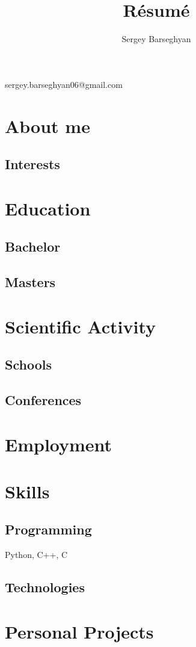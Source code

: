 \documentclass{article}
\makeatletter
\renewcommand{\maketitle}{
\begin{center}
{\bfseries\Huge\theauthor}
\vspace{0.25em}


sergey.barseghyan06@gmail.com
\end{center}
}
\makeatother
\begin{document}
\title{R\'esum\'e}

\author{Sergey Barseghyan}
\maketitle

\section{About me}

\subsection{Interests}


\section{Education} 
\subsection{Bachelor}
\subsection{Masters}

\section{Scientific Activity}
\subsection{Schools}
\subsection{Conferences}

\section{Employment}


\section{Skills}
\subsection{Programming}
Python, C++, C
\subsection{Technologies}
\section{Personal Projects}
\end{document}
